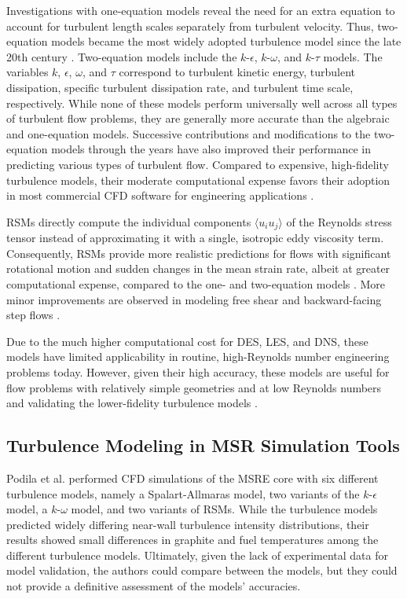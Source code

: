 Investigations with
one-equation models reveal the need for an extra equation to account for
turbulent length scales separately from turbulent velocity. Thus, two-equation
models became the most widely adopted turbulence model since the late 20th century
\cite{pope_turbulent_2000}. Two-equation models include the $k$-$\epsilon$,
$k$-$\omega$, and $k$-$\tau$ models. The variables $k$, $\epsilon$, $\omega$,
and $\tau$ correspond to turbulent kinetic energy, turbulent dissipation,
specific turbulent dissipation rate, and turbulent time scale, respectively.
While none of these models perform universally well across all types of
turbulent flow problems, they are generally more
accurate than the algebraic and one-equation models. Successive contributions
and modifications to the two-equation models through the years have also
improved their performance in predicting various types of turbulent flow. Compared to expensive,
high-fidelity turbulence models, their moderate computational expense favors their adoption in most
commercial \gls{CFD} software for engineering applications \cite{pope_turbulent_2000}.

\glspl{RSM} directly compute the individual components $\langle u_i u_j
\rangle$ of the Reynolds stress tensor instead of approximating it with a
single, isotropic eddy viscosity term. Consequently, \glspl{RSM} provide
more realistic predictions for flows with significant rotational motion and
sudden changes in the mean strain rate, albeit at greater computational
expense, compared to the one- and two-equation models
\cite{wilcox_turbulence_2006}. More minor improvements are observed in modeling
free shear and backward-facing step flows \cite{wilcox_turbulence_2006}.

Due to the much higher computational cost for \gls{DES}, \gls{LES}, and
\gls{DNS}, these models have limited applicability in routine, high-Reynolds
number engineering problems today. However, given their high accuracy, these
models are useful for flow problems with relatively simple geometries and at
low Reynolds numbers and validating the lower-fidelity turbulence models
\cite{zhiyin_large-eddy_2015}.

\subsection{Turbulence Modeling in MSR Simulation Tools}

Podila et al. \cite{podila_cfd_2019} performed \gls{CFD} simulations of the
\gls{MSRE} core with six different turbulence models, namely a Spalart-Allmaras
model, two variants of the $k$-$\epsilon$ model, a $k$-$\omega$ model, and two
variants of \glspl{RSM}. While the turbulence models predicted widely differing near-wall
turbulence intensity distributions, their results showed small differences
in graphite and fuel temperatures among the different turbulence models. Ultimately, given
the lack of experimental data for model validation, the authors could compare between the
models, but they could not provide a definitive
assessment of the models' accuracies.

